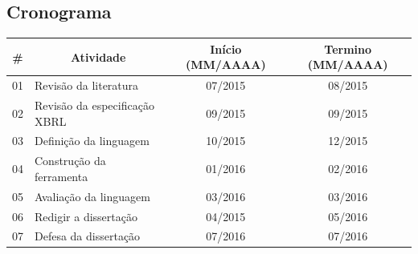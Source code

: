 \documentclass[msc,proposal,hidelot,hideabstract]{ppgccufmg} %
\begin{document}
\begin{attachments}
\chapter{Cronograma}
\label{attch:cronograma}

\begin{table}[h]
\begin{tabular}{|c|l|c|c|}
\hline
\rowcolor[HTML]{C0C0C0} 
\textbf{\#} & \multicolumn{1}{c|}{\cellcolor[HTML]{C0C0C0}\textbf{Atividade}} & \textbf{Início (MM/AAAA)} & \textbf{Termino  (MM/AAAA)} \\ \hline
01          & Revisão da literatura                                           & 07/2015                   & 08/2015                     \\ \hline
02          & Revisão da especificação XBRL                                   & 09/2015                   & 09/2015                     \\ \hline
03          & Definição da linguagem                                          & 10/2015                   & 12/2015                     \\ \hline
04          & Construção da ferramenta                                        & 01/2016                   & 02/2016                     \\ \hline
05          & Avaliação da linguagem                                          & 03/2016                   & 03/2016                     \\ \hline
06          & Redigir a dissertação                                           & 04/2015                   & 05/2016                     \\ \hline
07          & Defesa da dissertação                                           & 07/2016                   & 07/2016                     \\ \hline
\end{tabular}
\label{tab:cronograma}
\end{table}

\end{attachments}
\end{document}
